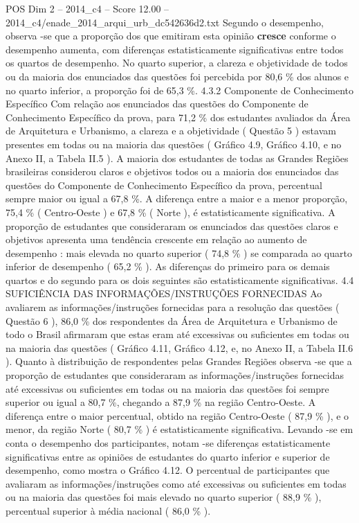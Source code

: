 \begin{textsample}{POS Dim 2 – 2014\_c4 – Score 12.00 – 2014\_c4/enade\_2014\_arqui\_urb\_dc542636d2.txt}
Segundo o desempenho, observa -se que a proporção dos que emitiram esta opinião \textbf{cresce} conforme o desempenho aumenta, com diferenças estatisticamente significativas entre todos os quartos de desempenho.
No quarto superior, a clareza e objetividade de todos ou da maioria dos enunciados das questões foi percebida por 80,6 \% dos alunos e no quarto inferior, a proporção foi de 65,3 \%. 4.3.2 Componente de Conhecimento Específico Com relação aos enunciados das questões do Componente de Conhecimento Específico da prova, para 71,2 \% dos estudantes avaliados da Área de Arquitetura e Urbanismo, a clareza e a objetividade ( Questão 5 ) estavam presentes em todas ou na maioria das questões ( Gráfico 4.9, Gráfico 4.10, e no Anexo II, a Tabela II.5 ).
A maioria dos estudantes de todas as Grandes Regiões brasileiras considerou claros e objetivos todos ou a maioria dos enunciados das questões do Componente de Conhecimento Específico da prova, percentual sempre maior ou igual a 67,8 \%.
A diferença entre a maior e a menor proporção, 75,4 \% ( Centro-Oeste ) e 67,8 \% ( Norte ), é estatisticamente significativa.
A proporção de estudantes que consideraram os enunciados das questões claros e objetivos apresenta uma tendência crescente em relação ao aumento de desempenho : mais elevada no quarto superior ( 74,8 \% ) se comparada ao quarto inferior de desempenho ( 65,2 \% ).
As diferenças do primeiro para os demais quartos e do segundo para os dois seguintes são estatisticamente significativas. 4.4 SUFICIÊNCIA DAS INFORMAÇÕES/INSTRUÇÕES FORNECIDAS Ao avaliarem as informações/instruções fornecidas para a resolução das questões ( Questão 6 ), 86,0 \% dos respondentes da Área de Arquitetura e Urbanismo de todo o Brasil afirmaram que estas eram até excessivas ou suficientes em todas ou na maioria das questões ( Gráfico 4.11, Gráfico 4.12, e, no Anexo II, a Tabela II.6 ).
Quanto à distribuição de respondentes pelas Grandes Regiões observa -se que a proporção de estudantes que consideraram as informações/instruções fornecidas até excessivas ou suficientes em todas ou na maioria das questões foi sempre superior ou igual a 80,7 \%, chegando a 87,9 \% na região Centro-Oeste.
A diferença entre o maior percentual, obtido na região Centro-Oeste ( 87,9 \% ), e o menor, da região Norte ( 80,7 \% ) é estatisticamente significativa.
Levando -se em conta o desempenho dos participantes, notam -se diferenças estatisticamente significativas entre as opiniões de estudantes do quarto inferior e superior de desempenho, como mostra o Gráfico 4.12.
O percentual de participantes que avaliaram as informações/instruções como até excessivas ou suficientes em todas ou na maioria das questões foi mais elevado no quarto superior ( 88,9 \% ), percentual superior à média nacional ( 86,0 \% ).

\end{textsample}
